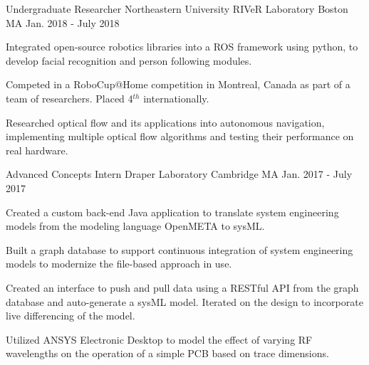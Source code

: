 
\begin{cventries}
  \cventry
    {Undergraduate Researcher} %
    {Northeastern University RIVeR Laboratory} %
    {Boston MA} %
    {Jan. 2018 - July 2018} %
    {
      \begin{cvitems} %
        \item {Integrated open-source robotics libraries into a ROS framework using python, to develop facial recognition and person following modules.}
        \item {Competed in a RoboCup@Home competition in Montreal, Canada as part of a team of researchers. Placed 4$^{th}$ internationally.}
        \item {Researched optical flow and its applications into autonomous navigation, implementing multiple optical flow algorithms and testing their performance on real hardware.}
      \end{cvitems}
    }

  \cventry
    {Advanced Concepts Intern} %
    {Draper Laboratory} %
    {Cambridge MA} %
    {Jan. 2017 - July 2017} %
    {
      \begin{cvitems} %
        \item {Created a custom back-end Java application to translate system engineering models from the modeling language OpenMETA to sysML.}
        \item {Built a graph database to support continuous integration of system engineering models to modernize the file-based approach in use.}
        \item {Created an interface to push and pull data using a RESTful API from the graph database and auto-generate a sysML model. Iterated on the design to incorporate live differencing of the model.}
        \item {Utilized ANSYS Electronic Desktop to model the effect of varying RF wavelengths on the operation of a simple PCB based on trace dimensions.}
      \end{cvitems}
    }


\end{cventries}
